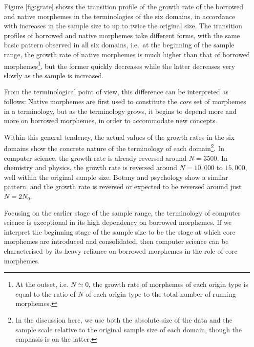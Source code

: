 \begin{figure*}[t]
\begin{center}
\end{center}
\caption{Transitions of the growth rate of borrowed and native morphemes}
\label{fig:grate}
\end{figure*}

Figure \ref{fig:grate} shows the transition profile of the growth rate of
the borrowed and native morphemes in the terminologies of the six domains, in
accordance with increases in the sample size to up to twice the original size.
The transition profiles of borrowed and native morphemes take different forms, 
with the same basic pattern observed in all six domains, i.e.\ at the 
beginning of the sample range, the
growth rate of native morphemes is much higher than that of borrowed
morphemes\footnote{At the outset, i.e. $N \simeq 0$, the growth
rate of morphemes of each origin type is equal to the ratio of $N$
of each origin type to the total number of running morphemes.}, but
the former quickly decreases while the latter decreases very slowly as
the sample is increased.

From the terminological point of view, this difference can be interpreted
as follows: Native morphemes are first used to constitute the {\it core}
set of morphemes in a terminology, but as the terminology grows, it begins to
depend more and more on borrowed morphemes, in order to accommodate 
new concepts.

Within this general tendency, the actual values of the growth rates in
the six domains show the concrete nature of the terminology of each
domain\footnote{In the discussion here, we use both the absolute size
of the data and the sample scale relative to the original sample size
of each domain, though the emphasis is on the latter.}.
In computer science, the growth rate is already reversed around $N=3500$.
In chemistry and physics, the growth rate is reversed around $N=10,000$
to $15,000$, well within the original sample size.
Botany and psychology show a similar pattern, and the growth rate is
reversed or expected to be reversed around just $N=2N_0$.

Focusing on the earlier stage of the sample range, the terminology
of computer science is exceptional in its high dependency on borrowed
morphemes. If we interpret the beginning stage of the sample size to be the
stage at which core morphemes are introduced and consolidated, then computer
science can be characterised by its heavy reliance on borrowed
morphemes in the role of core morphemes.

